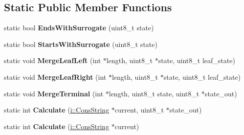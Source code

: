 \subsection*{Static Public Member Functions}
\begin{DoxyCompactItemize}
\item 
static bool {\bfseries Ends\+With\+Surrogate} (uint8\+\_\+t state)\hypertarget{classv8_1_1_utf8_length_helper_ad8e5d910b375263f132db48aab6da786}{}\label{classv8_1_1_utf8_length_helper_ad8e5d910b375263f132db48aab6da786}

\item 
static bool {\bfseries Starts\+With\+Surrogate} (uint8\+\_\+t state)\hypertarget{classv8_1_1_utf8_length_helper_a02d1622afeec32cc7226521dea334dc4}{}\label{classv8_1_1_utf8_length_helper_a02d1622afeec32cc7226521dea334dc4}

\item 
static void {\bfseries Merge\+Leaf\+Left} (int $\ast$length, uint8\+\_\+t $\ast$state, uint8\+\_\+t leaf\+\_\+state)\hypertarget{classv8_1_1_utf8_length_helper_a9010472ac0eaf7be001f783d72800d1f}{}\label{classv8_1_1_utf8_length_helper_a9010472ac0eaf7be001f783d72800d1f}

\item 
static void {\bfseries Merge\+Leaf\+Right} (int $\ast$length, uint8\+\_\+t $\ast$state, uint8\+\_\+t leaf\+\_\+state)\hypertarget{classv8_1_1_utf8_length_helper_ad501b658a8c5dccb4f28c394d747d1a7}{}\label{classv8_1_1_utf8_length_helper_ad501b658a8c5dccb4f28c394d747d1a7}

\item 
static void {\bfseries Merge\+Terminal} (int $\ast$length, uint8\+\_\+t state, uint8\+\_\+t $\ast$state\+\_\+out)\hypertarget{classv8_1_1_utf8_length_helper_a866662cbccc1452c46c45bc185068235}{}\label{classv8_1_1_utf8_length_helper_a866662cbccc1452c46c45bc185068235}

\item 
static int {\bfseries Calculate} (\hyperlink{classv8_1_1internal_1_1_cons_string}{i\+::\+Cons\+String} $\ast$current, uint8\+\_\+t $\ast$state\+\_\+out)\hypertarget{classv8_1_1_utf8_length_helper_a08d4928ad93a207d1758d72a20a1c939}{}\label{classv8_1_1_utf8_length_helper_a08d4928ad93a207d1758d72a20a1c939}

\item 
static int {\bfseries Calculate} (\hyperlink{classv8_1_1internal_1_1_cons_string}{i\+::\+Cons\+String} $\ast$current)\hypertarget{classv8_1_1_utf8_length_helper_ac645ac9c82636113933d43c8d6ebde5a}{}\label{classv8_1_1_utf8_length_helper_ac645ac9c82636113933d43c8d6ebde5a}

\end{DoxyCompactItemize}
